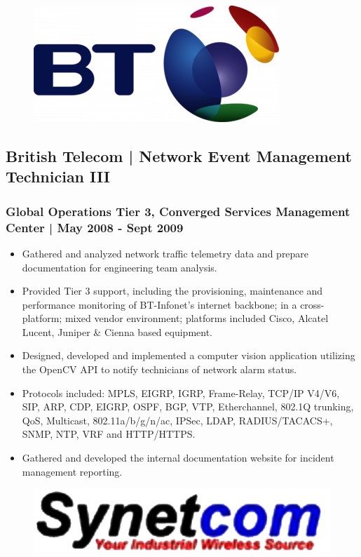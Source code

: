 \documentclass[letter,10pt]{article}
\begin{document}
\begin{figure}
\includegraphics[width=0.8\linewidth]{./img/50p_cr_bt.jpg}
\end{figure}

\subsection*{British Telecom | Network Event Management Technician III}
\label{sec:org6dbf9ee}
\subsubsection*{Global Operations Tier 3, Converged Services Management Center | May 2008 - Sept 2009}
\label{sec:orgab59e6e}
\begin{itemize}
\item Gathered and analyzed network traffic telemetry data and prepare documentation for engineering team analysis.
\item Provided Tier 3 support, including the provisioning, maintenance and performance monitoring of BT-Infonet’s internet backbone; in a cross-platform; mixed vendor environment; platforms included Cisco, Alcatel Lucent, Juniper \& Cienna based equipment.
\item Designed, developed and implemented a computer vision application utilizing the OpenCV API to notify technicians of network alarm status.
\item Protocols included: MPLS, EIGRP, IGRP, Frame-Relay, TCP/IP V4/V6, SIP, ARP, CDP, EIGRP, OSPF, BGP, VTP, Etherchannel, 802.1Q trunking, QoS, Multicast, 802.11a/b/g/n/ac, IPSec, LDAP, RADIUS/TACACS+, SNMP, NTP, VRF and HTTP/HTTPS.
\item Gathered and developed the internal documentation website for incident management reporting.
\end{itemize}



\begin{figure}
\includegraphics[width=0.8\linewidth]{./img/50p_cr_synetcom.jpg}
\end{figure}
\end{document}
